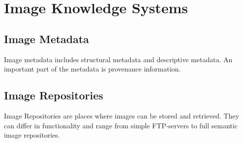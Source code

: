 
\chapter{Image Knowledge Systems} %

\label{Chapter2} %



\section{Image Metadata}

Image metadata includes structural
metadata and descriptive
metadata. An important part of the
metadata is provenance information.


\section{Image Repositories}

Image Repositories are places where
images can be stored and retrieved. They can differ in functionality
and range from simple FTP-servers to full
semantic image repositories.
